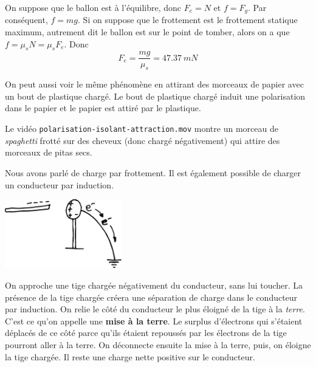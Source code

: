 \begin{reponsebox}
  On suppose que le ballon est à l'équilibre, donc $F_e = N$ et $f = F_g$. Par
  conséquent, $f = mg$. Si on suppose que le frottement est le frottement
  statique maximum, autrement dit le ballon est sur le point de tomber, alors
  on a que $f = \mu_s N = \mu_s F_e$. Donc
  \[
    F_e = \frac{mg}{\mu_s} = \SI{47.37}{mN}
  \]
\end{reponsebox}

On peut aussi voir le même phénomène en attirant des morceaux de papier avec un
bout de plastique chargé. Le bout de plastique chargé induit une polarisation
dans le papier et le papier est attiré par le plastique.

\begin{diapobox}

  Le vidéo \texttt{polarisation-isolant-attraction.mov} montre un morceau de
  \textit{spaghetti} frotté sur des cheveux (donc chargé négativement) qui
  attire des morceaux de pitas secs.
\end{diapobox}









Nous avons parlé de charge par frottement. Il est également possible de
charger un conducteur par induction.
\begin{center}
  \includegraphics[height=3cm]{01-force-electrique/figures/charge-induction-3.pdf}
\end{center}
On approche une tige chargée négativement du conducteur, sans lui toucher. La
présence de la tige chargée créera une séparation de charge dans le conducteur
par induction.  On relie le côté du conducteur le plus éloigné de la tige à la
\textit{terre}.  C'est ce qu'on appelle une \textbf{mise à la terre}. Le
surplus d'électrons qui s'étaient déplacés de ce côté parce qu'ils étaient
repoussés par les électrons de la tige pourront aller à la terre. On déconnecte
ensuite la mise à la terre, puis, on éloigne la tige chargée. Il reste une
charge nette positive sur le conducteur.


